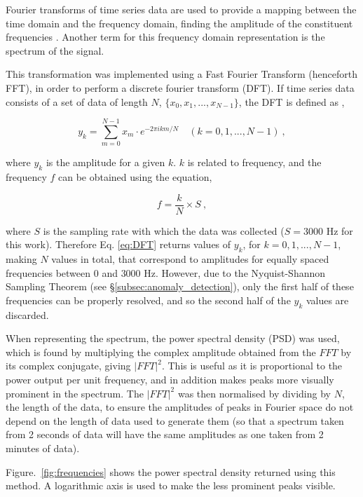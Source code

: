 Fourier transforms of time series data are used to provide a mapping between the time domain and the frequency domain, finding the amplitude of the constituent frequencies \cite{hsu_1984}. Another term for this frequency domain representation is the spectrum of the signal. 

This transformation was implemented using a Fast Fourier Transform (henceforth FFT), in order to perform a discrete fourier transform (DFT). If time series data consists of a set of data of length $N$, $\{ x_0, x_1,...,x_{N-1} \}$, the DFT is defined as \cite{hsu_1984},

\begin{equation}
    y_k = \sum_{m=0}^{N-1} x_m \cdot e^{-2\pi ikm/N} \quad (k = 0,1,...,N-1)~,
    \label{eq:DFT}
\end{equation}

where $y_k$ is the amplitude for a given $k$. $k$ is related to frequency, and the frequency $f$ can be obtained using the equation,

\begin{equation}
    f = \dfrac{k}{N} \times S~,
    \label{eq:freq_from_k}
\end{equation}

where $S$ is the sampling rate with which the data was collected ($S=3000$ Hz for this work). Therefore Eq. \eqref{eq:DFT} returns values of $y_k$, for $k = 0,1,...,N-1$, making $N$ values in total, that correspond to amplitudes for equally spaced frequencies between $0$ and $3000$ Hz. However, due to the Nyquist-Shannon Sampling Theorem (see \S\ref{subsec:anomaly_detection}), only the first half of these frequencies can be properly resolved, and so the second half of the $y_k$ values are discarded.

When representing the spectrum, the power spectral density (PSD) was used, which is found by multiplying the complex amplitude obtained from the $FFT$ by its complex conjugate, giving $|FFT|^2$. This is useful as it is proportional to the power output per unit frequency, and in addition makes peaks more visually prominent in the spectrum. The $|FFT|^2$ was then normalised by dividing by $N$, the length of the data, to ensure the amplitudes of peaks in Fourier space do not depend on the length of data used to generate them (so that a spectrum taken from 2 seconds of data will have the same amplitudes as one taken from 2 minutes of data).

Figure.~\ref{fig:frequencies} shows the power spectral density returned using this method. A logarithmic axis is used to make the less prominent peaks visible.

